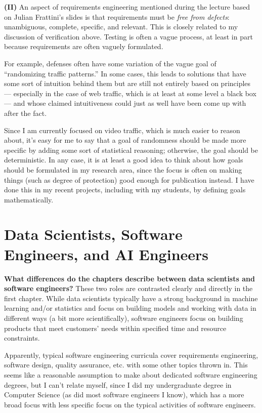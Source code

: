 \documentclass[11pt]{article}
\begin{document}
\textbf{(II)} An aspect of requirements engineering mentioned during the lecture based on Julian Frattini's slides is that requirements must be \textit{free from defects}: unambiguous, complete, specific, and relevant. This is closely related to my discussion of verification above. Testing is often a vague process, at least in part because requirements are often vaguely formulated.

For example, defenses often have some variation of the vague goal of ``randomizing traffic patterns.'' In some cases, this leads to solutions that have some sort of intuition behind them but are still not entirely based on principles --- especially in the case of web traffic, which is at least at some level a black box --- and whose claimed intuitiveness could just as well have been come up with after the fact.

Since I am currently focused on video traffic, which is much easier to reason about, it's easy for me to say that a goal of randomness should be made more specific by adding some sort of statistical reasoning; otherwise, the goal should be deterministic. In any case, it is at least a good idea to think about how goals should be formulated in my research area, since the focus is often on making things (such as degree of protection) good enough for publication instead. I have done this in my recent projects, including with my students, by defining goals mathematically.

\section{Data Scientists, Software Engineers, and AI Engineers}

\textbf{What differences do the chapters describe between data scientists
and software engineers?} These two roles are contrasted clearly and directly in the first chapter. While data scientists typically have a strong background in machine learning and/or statistics and focus on building models and working with data in different ways (a bit more scientifically), software engineers focus on building products that meet customers' needs within specified time and resource constraints.

Apparently, typical software engineering curricula cover requirements engineering, software design, quality assurance, etc. with some other topics thrown in. This seems like a reasonable assumption to make about dedicated software engineering degrees, but I can't relate myself, since I did my undergraduate degree in Computer Science (as did most software engineers I know), which has a more broad focus with less specific focus on the typical activities of software engineers.
\end{document}
